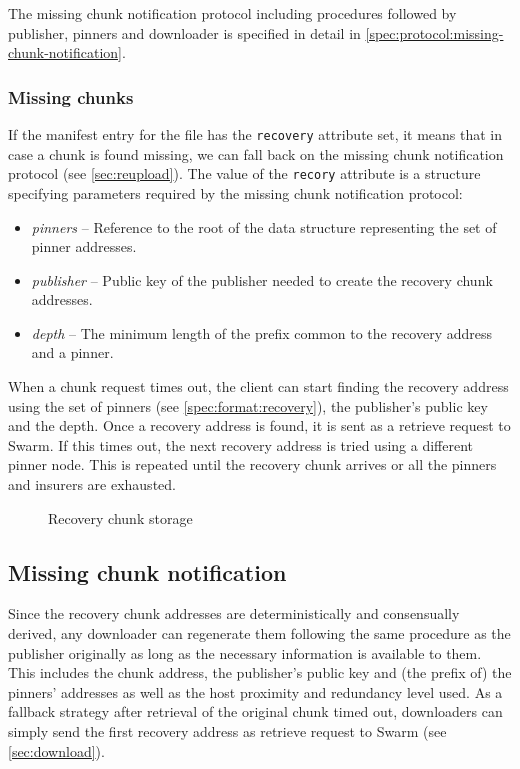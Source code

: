 The missing chunk notification protocol including procedures followed by publisher, pinners and downloader is specified in detail in  \ref{spec:protocol:missing-chunk-notification}.


\subsubsection{Missing chunks}

If the manifest entry for the file has the \lstinline{recovery} attribute set, it means that in case a chunk is found missing, we can fall back on the missing chunk notification protocol (see \ref{sec:reupload}). The value of the \lstinline{recory} attribute is a structure specifying parameters required by the missing chunk notification protocol:

\begin{itemize}
\item \emph{pinners} -- Reference to the root of the data structure representing the set of pinner addresses. 
\item \emph{publisher} -- Public key of the publisher needed to create the recovery chunk addresses.
\item \emph{depth} -- The minimum length of the prefix common to the recovery address and a pinner.  
\end{itemize}

When a chunk request times out, the client can start finding  the recovery address using the set of pinners (see \ref{spec:format:recovery}), the publisher's public key and the depth. Once a recovery address is found, it is sent as a retrieve request to Swarm. If this times out, the next recovery address is tried using a different pinner node. This is repeated until the recovery chunk arrives or all the pinners and insurers are exhausted.

\begin{figure}[htbp]
  \centering
  \caption[Recovery chunk storage \statusred]{Recovery chunk storage}
  \label{fig:recovery-chunk-storage}
\end{figure}


\subsection{Missing chunk notification \statusyellow}\label{sec:missing-chunk-notifications}

Since the recovery chunk addresses are deterministically and consensually derived, any downloader can regenerate them following the same procedure as the publisher originally as long as the necessary information is available to them. This includes the chunk address, the publisher's public key and (the prefix of) the pinners' addresses as well as the host proximity and redundancy level used. As a fallback strategy after retrieval of the original chunk timed out, downloaders can simply send the first recovery address as retrieve request to Swarm (see \ref{sec:download}).

